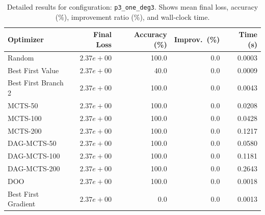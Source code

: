 \begin{table}[H]
\centering
\caption{Detailed results for configuration: \texttt{p3\_one\_deg3}. Shows mean final loss, accuracy (\%), improvement ratio (\%), and wall-clock time.}
\label{tab:funclearn-detail-14}
\begin{tabular}{lrrrr}
\toprule
Optimizer & Final Loss & Accuracy (\%) & Improv.~(\%) & Time (s) \\
\midrule
Random & \textbf{$2.37e+00$} & 100.0 & 0.0 & 0.0003 \\
\hline
Best First Value & \textbf{$2.37e+00$} & 40.0 & 0.0 & 0.0009 \\
\hline
Best First Branch 2 & \textbf{$2.37e+00$} & 100.0 & 0.0 & 0.0043 \\
\hline
MCTS-50 & \textbf{$2.37e+00$} & 100.0 & 0.0 & 0.0208 \\
\hline
MCTS-100 & \textbf{$2.37e+00$} & 100.0 & 0.0 & 0.0428 \\
\hline
MCTS-200 & \textbf{$2.37e+00$} & 100.0 & 0.0 & 0.1217 \\
\hline
DAG-MCTS-50 & \textbf{$2.37e+00$} & 100.0 & 0.0 & 0.0580 \\
\hline
DAG-MCTS-100 & \textbf{$2.37e+00$} & 100.0 & 0.0 & 0.1181 \\
\hline
DAG-MCTS-200 & \textbf{$2.37e+00$} & 100.0 & 0.0 & 0.2643 \\
\hline
DOO & \textbf{$2.37e+00$} & 100.0 & 0.0 & 0.0018 \\
\hline
Best First Gradient & \textbf{$2.37e+00$} & 0.0 & 0.0 & 0.0013 \\
\bottomrule
\end{tabular}
\end{table}

